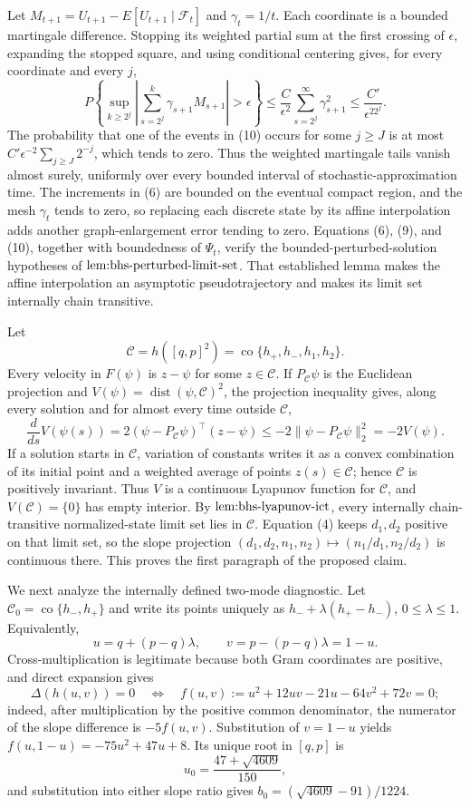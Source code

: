 Let \(M_{t+1}=U_{t+1}-E[U_{t+1}\mid\mathcal F_t]\) and \(\gamma_t=1/t\). Each coordinate is a bounded martingale difference. Stopping its weighted partial sum at the first crossing of \(\epsilon\), expanding the stopped square, and using conditional centering gives, for every coordinate and every \(j\),
\[
 P\left\{\sup_{k\geq2^j}\left|\sum_{s=2^j}^k\gamma_{s+1}M_{s+1}\right|>\epsilon\right\}
 \leq \frac{C}{\epsilon^2}\sum_{s=2^j}^{\infty}\gamma_{s+1}^2
 \leq\frac{C'}{\epsilon^22^j}. \tag{10}
\]
The probability that one of the events in (10) occurs for some \(j\geq J\) is at most \(C'\epsilon^{-2}\sum_{j\geq J}2^{-j}\), which tends to zero. Thus the weighted martingale tails vanish almost surely, uniformly over every bounded interval of stochastic-approximation time. The increments in (6) are bounded on the eventual compact region, and the mesh \(\gamma_t\) tends to zero, so replacing each discrete state by its affine interpolation adds another graph-enlargement error tending to zero. Equations (6), (9), and (10), together with boundedness of \(\Psi_t\), verify the bounded-perturbed-solution hypotheses of \(\textnormal{lem:bhs-perturbed-limit-set}\). That established lemma makes the affine interpolation an asymptotic pseudotrajectory and makes its limit set internally chain transitive.

Let
\[
 \mathcal C=h([q,p]^2)=\operatorname{co}\{h_+,h_-,h_1,h_2\}.
\]
Every velocity in \(F(\psi)\) is \(z-\psi\) for some \(z\in\mathcal C\). If \(P_{\mathcal C}\psi\) is the Euclidean projection and \(V(\psi)=\operatorname{dist}(\psi,\mathcal C)^2\), the projection inequality gives, along every solution and for almost every time outside \(\mathcal C\),
\[
 \frac{d}{ds}V(\psi(s))
 =2(\psi-P_{\mathcal C}\psi)^\top(z-\psi)
 \leq-2\|\psi-P_{\mathcal C}\psi\|_2^2=-2V(\psi). \tag{11}
\]
If a solution starts in \(\mathcal C\), variation of constants writes it as a convex combination of its initial point and a weighted average of points \(z(s)\in\mathcal C\); hence \(\mathcal C\) is positively invariant. Thus \(V\) is a continuous Lyapunov function for \(\mathcal C\), and \(V(\mathcal C)=\{0\}\) has empty interior. By \(\textnormal{lem:bhs-lyapunov-ict}\), every internally chain-transitive normalized-state limit set lies in \(\mathcal C\). Equation (4) keeps \(d_1,d_2\) positive on that limit set, so the slope projection \((d_1,d_2,n_1,n_2)\mapsto(n_1/d_1,n_2/d_2)\) is continuous there. This proves the first paragraph of the proposed claim.

We next analyze the internally defined two-mode diagnostic. Let \(\mathcal C_0=\operatorname{co}\{h_-,h_+\}\) and write its points uniquely as \(h_-+\lambda(h_+-h_-)\), \(0\leq\lambda\leq1\). Equivalently,
\[
 u=q+(p-q)\lambda,\qquad v=p-(p-q)\lambda=1-u. \tag{12}
\]
Cross-multiplication is legitimate because both Gram coordinates are positive, and direct expansion gives
\[
 \Delta(h(u,v))=0
 \quad\Longleftrightarrow\quad
 f(u,v):=u^2+12uv-21u-64v^2+72v=0; \tag{13}
\]
indeed, after multiplication by the positive common denominator, the numerator of the slope difference is \(-5f(u,v)\). Substitution of \(v=1-u\) yields \(f(u,1-u)=-75u^2+47u+8\). Its unique root in \([q,p]\) is
\[
 u_0=\frac{47+\sqrt{4609}}{150},
\]
and substitution into either slope ratio gives \(b_0=(\sqrt{4609}-91)/1224\).

